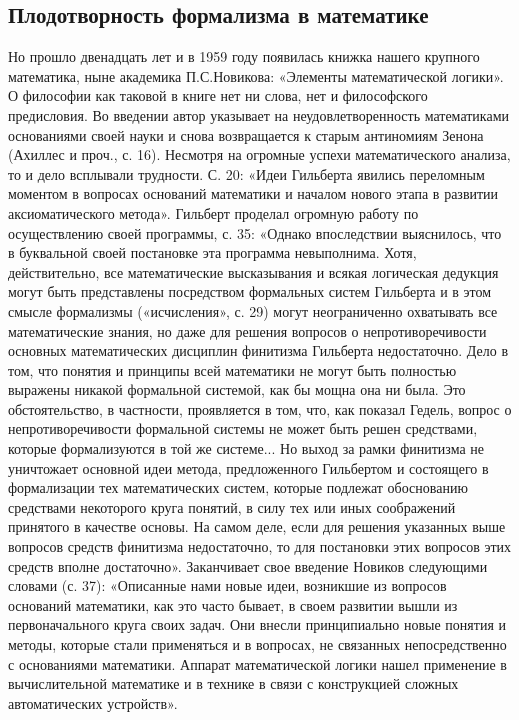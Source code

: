 \subsection{Плодотворность формализма в математике}

Но   прошло  двенадцать   лет   и  в   1959   году  появилась   книжка
нашего  крупного математика,  ныне  академика П.С.Новикова:  «Элементы
математической логики». О философии как  таковой в книге нет ни слова,
нет  и  философского  предисловия.  Во  введении  автор  указывает  на
неудовлетворенность  математиками  основаниями  своей  науки  и  снова
возвращается  к старым  антиномиям Зенона  (Ахиллес и  проч., с.  16).
Несмотря  на  огромные  успехи  математического  анализа,  то  и  дело
всплывали  трудности.  С.  20:   «Идеи  Гильберта  явились  переломным
моментом  в  вопросах  оснований  математики и  началом  нового  этапа
в  развитии  аксиоматического   метода».  Гильберт  проделал  огромную
работу по  осуществлению своей программы, с.  35: «Однако впоследствии
выяснилось,   что  в   буквальной  своей   постановке  эта   программа
невыполнима.  Хотя,  действительно,  все  математические  высказывания
и  всякая  логическая  дедукция могут  быть  представлены  посредством
формальных систем Гильберта и  в этом смысле формализмы («исчисления»,
с. 29)  могут неограниченно  охватывать все математические  знания, но
даже для решения вопросов о непротиворечивости основных математических
дисциплин финитизма Гильберта недостаточно. Дело  в том, что понятия и
принципы  всей математики  не  могут быть  полностью выражены  никакой
формальной системой, как  бы мощна она ни была.  Это обстоятельство, в
частности,  проявляется  в том,  что,  как  показал Гедель,  вопрос  о
непротиворечивости формальной системы не  может быть решен средствами,
которые формализуются в той же  системе... Но выход за рамки финитизма
не  уничтожает  основной  идеи   метода,  предложенного  Гильбертом  и
состоящего в формализации тех  математических систем, которые подлежат
обоснованию средствами некоторого  круга понятий, в силу  тех или иных
соображений  принятого в  качестве  основы. На  самом  деле, если  для
решения указанных выше вопросов средств финитизма недостаточно, то для
постановки этих вопросов этих  средств вполне достаточно». Заканчивает
свое  введение Новиков  следующими  словами (с.  37): «Описанные  нами
новые  идеи,  возникшие  из  вопросов оснований  математики,  как  это
часто бывает,  в своем развитии  вышли из первоначального  круга своих
задач.  Они  внесли  принципиально  новые понятия  и  методы,  которые
стали  применяться  и  в  вопросах,  не  связанных  непосредственно  с
основаниями математики. Аппарат математической логики нашел применение
в вычислительной математике и в технике в связи с конструкцией сложных
автоматических устройств».

